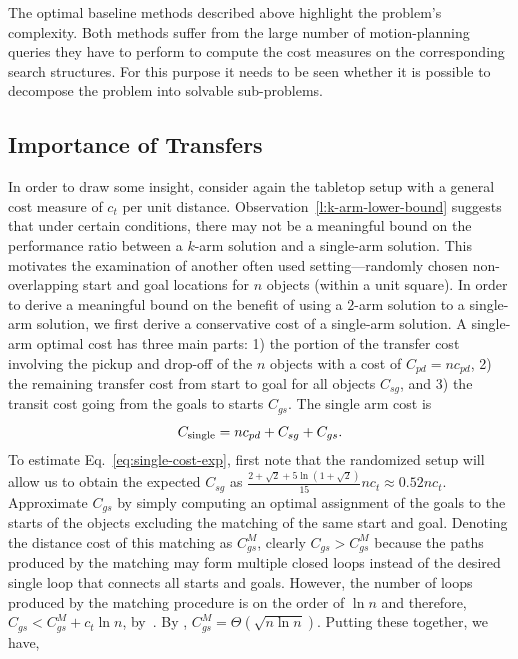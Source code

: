 
The optimal baseline methods described above highlight the problem's complexity. Both methods suffer from the large number of motion-planning queries they have to perform to compute the cost measures on the corresponding search structures. For this purpose it needs to be seen whether it is possible to decompose the problem into solvable sub-problems. 

\subsection{Importance of Transfers} In order to draw some insight, consider again the tabletop setup with a general cost measure of $c_t$ per unit distance.
Observation~\ref{l:k-arm-lower-bound} suggests that under certain conditions, there 
may not be a meaningful bound on the performance ratio between a $k$-arm 
solution and a single-arm solution. This motivates the examination of another
often used setting---randomly chosen non-overlapping 
start and goal locations for $n$ objects (within a unit square). In order to derive a 
meaningful bound on the benefit of using a $2$-arm solution 
to a single-arm solution, we first derive a conservative cost of a single-arm solution. 
A single-arm optimal cost has three main parts: 1) the portion of the transfer cost involving the pickup and 
drop-off of the $n$ objects with a cost of $C_{pd} = nc_{pd}$, 2) the remaining transfer cost from 
start to goal for all objects $C_{sg}$, and 3) the transit cost 
going from the goals to starts $C_{gs}$. The single arm cost is  
\begin{equation}
\label{eq:single-cost-exp}
C_{\rm single} = nc_{pd} + C_{sg} + C_{gs}.
\end{equation}
To estimate Eq.~\ref{eq:single-cost-exp}, first note that the randomized setup 
will allow us to obtain the expected $C_{sg}$\cite{santalo2004integral} as
$\frac{2 + \sqrt{2} + 5\ln(1+\sqrt{2})}{15}nc_t \approx 0.52nc_t$.
Approximate $C_{gs}$ by simply computing an optimal assignment of the 
goals to the starts of the objects excluding the matching of the same start 
and goal. Denoting the distance cost of this matching as $C_{gs}^M$, clearly
$C_{gs} > C_{gs}^M$ because the paths produced by the matching may form 
multiple closed loops instead of the desired single loop that connects all 
starts and goals. However, the number of loops produced by the matching 
procedure is on the order of $\ln n$ and therefore, $C_{gs} < C_{gs}^M + 
c_t\ln n$, by~\cite{TrePavFra13}. By \cite{AjtKomTus84}, 
$C_{gs}^M = \Theta(\sqrt{n\ln n})$. Putting these together, we have,

